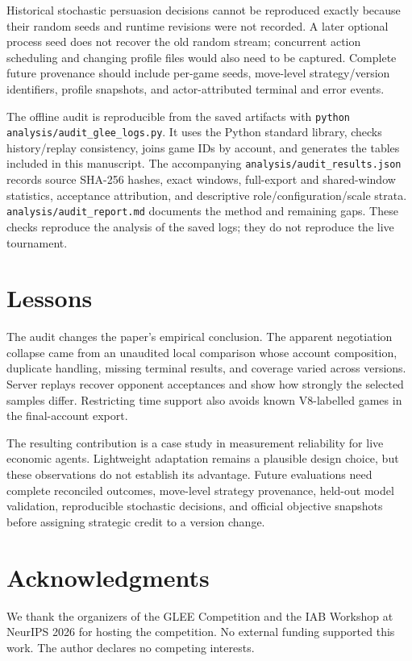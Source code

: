 \documentclass{article}
\begin{document}
Historical stochastic persuasion decisions cannot be reproduced exactly because their random seeds and runtime revisions were not recorded. A later optional process seed does not recover the old random stream; concurrent action scheduling and changing profile files would also need to be captured. Complete future provenance should include per-game seeds, move-level strategy/version identifiers, profile snapshots, and actor-attributed terminal and error events.

The offline audit is reproducible from the saved artifacts with \texttt{python analysis/audit\_glee\_logs.py}. It uses the Python standard library, checks history/replay consistency, joins game IDs by account, and generates the tables included in this manuscript. The accompanying \texttt{analysis/audit\_results.json} records source SHA-256 hashes, exact windows, full-export and shared-window statistics, acceptance attribution, and descriptive role/configuration/scale strata. \texttt{analysis/audit\_report.md} documents the method and remaining gaps. These checks reproduce the analysis of the saved logs; they do not reproduce the live tournament.

\section{Lessons}

The audit changes the paper's empirical conclusion. The apparent negotiation collapse came from an unaudited local comparison whose account composition, duplicate handling, missing terminal results, and coverage varied across versions. Server replays recover opponent acceptances and show how strongly the selected samples differ. Restricting time support also avoids known V8-labelled games in the final-account export.

The resulting contribution is a case study in measurement reliability for live economic agents. Lightweight adaptation remains a plausible design choice, but these observations do not establish its advantage. Future evaluations need complete reconciled outcomes, move-level strategy provenance, held-out model validation, reproducible stochastic decisions, and official objective snapshots before assigning strategic credit to a version change.

\section*{Acknowledgments}
We thank the organizers of the GLEE Competition and the IAB Workshop at NeurIPS 2026 for hosting the competition. No external funding supported this work. The author declares no competing interests.
\end{document}
